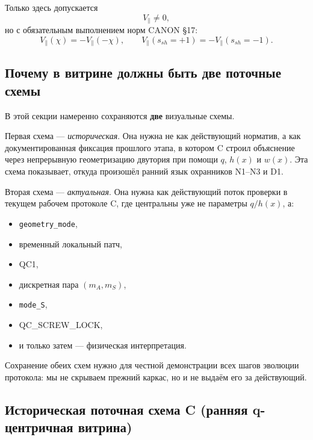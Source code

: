 Только здесь допускается
\[
V_\parallel\neq 0,
\]
но с обязательным выполнением норм CANON \S17:
\[
V_\parallel(\chi)=-V_\parallel(-\chi),
\qquad
V_\parallel(s_{sh}=+1)=-V_\parallel(s_{sh}=-1).
\]

\subsection{Почему в витрине должны быть две поточные схемы}

В этой секции намеренно сохраняются \textbf{две} визуальные схемы.

Первая схема --- \emph{историческая}. Она нужна не как действующий норматив, а как
документированная фиксация прошлого этапа, в котором C строил объяснение через
непрерывную геометризацию двутория при помощи $q$, $h(x)$ и $w(x)$.
Эта схема показывает, откуда произошёл ранний язык охранников N1--N3 и D1.

Вторая схема --- \emph{актуальная}. Она нужна как действующий поток проверки в текущем
рабочем протоколе C, где центральны уже не параметры $q/h(x)$, а:
\begin{itemize}
\item \texttt{geometry\_mode},
\item временный локальный патч,
\item QC1,
\item дискретная пара $(m_A,m_S)$,
\item \texttt{mode\_S},
\item QC\_SCREW\_LOCK,
\item и только затем --- физическая интерпретация.
\end{itemize}

Сохранение обеих схем нужно для честной демонстрации всех шагов эволюции протокола:
мы не скрываем прежний каркас, но и не выдаём его за действующий.

\subsection{Историческая поточная схема C (ранняя q-центричная витрина)}

